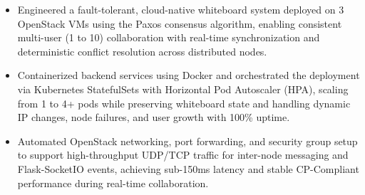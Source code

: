 \begin{samepage}
{
  {\begin{itemize}
    \item Engineered a fault-tolerant, cloud-native whiteboard system deployed on 3 OpenStack VMs using the Paxos consensus algorithm, enabling consistent multi-user (1 to 10) collaboration with real-time synchronization and deterministic conflict resolution across distributed nodes.
    \item Containerized backend services using Docker and orchestrated the deployment via Kubernetes StatefulSets with Horizontal Pod Autoscaler (HPA), scaling from 1 to 4+ pods while preserving whiteboard state and handling dynamic IP changes, node failures, and user growth with 100\% uptime.
    \item Automated OpenStack networking, port forwarding, and security group setup to support high-throughput UDP/TCP traffic for inter-node messaging and Flask-SocketIO events, achieving sub-150ms latency and stable CP-Compliant performance during real-time collaboration.
  \end{itemize}
  }
}
\end{samepage}
